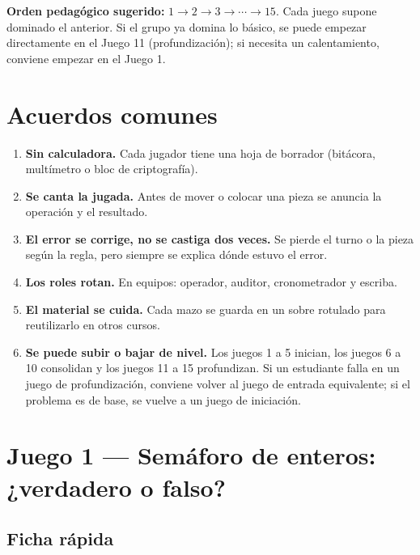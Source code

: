 \documentclass[12pt, letterpaper]{article}
\begin{document}
\textbf{Orden pedagógico sugerido:} $1\to2\to3\to\cdots\to15$. Cada juego supone dominado el anterior. Si el grupo ya domina lo básico, se puede empezar directamente en el Juego 11 (profundización); si necesita un calentamiento, conviene empezar en el Juego 1.

\section*{Acuerdos comunes}

\begin{enumerate}[leftmargin=*]
  \item \textbf{Sin calculadora.} Cada jugador tiene una hoja de borrador (bitácora, multímetro o bloc de criptografía).
  \item \textbf{Se canta la jugada.} Antes de mover o colocar una pieza se anuncia la operación y el resultado.
  \item \textbf{El error se corrige, no se castiga dos veces.} Se pierde el turno o la pieza según la regla, pero siempre se explica dónde estuvo el error.
  \item \textbf{Los roles rotan.} En equipos: operador, auditor, cronometrador y escriba.
  \item \textbf{El material se cuida.} Cada mazo se guarda en un sobre rotulado para reutilizarlo en otros cursos.
  \item \textbf{Se puede subir o bajar de nivel.} Los juegos 1 a 5 inician, los juegos 6 a 10 consolidan y los juegos 11 a 15 profundizan. Si un estudiante falla en un juego de profundización, conviene volver al juego de entrada equivalente; si el problema es de base, se vuelve a un juego de iniciación.
\end{enumerate}

\clearpage
\section{Juego 1 — Semáforo de enteros: ¿verdadero o falso?}

\subsection{Ficha rápida}
\end{document}
